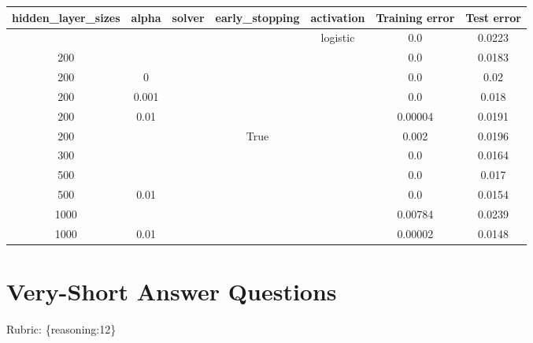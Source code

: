 \documentclass{article}
\def\rubric#1{\gre{Rubric: \{#1\}}}{}
\def\gre#1{{\color{gre}#1}}
\begin{document}
\begin{center}
\begin{tabular}{ |c|c|c|c|c||c|c| } 
 \hline
 hidden\_layer\_sizes & alpha & solver & early\_stopping & activation & Training error & Test error \\ 
 \hline \hline
  & & & & logistic & 0.0 & 0.0223\\ 
 200 & & & & & 0.0 & 0.0183\\ 
 200 & 0& & & & 0.0 & 0.02\\ 
 200 & 0.001 & & & & 0.0 & 0.018\\ 
 200 & 0.01 & & & & 0.00004 & 0.0191\\ 
 200 & & & True & & 0.002 & 0.0196\\ 
 300 & & & & & 0.0 & 0.0164\\ 
 500 & & & & & 0.0 & 0.017\\ 
 500 & 0.01 & & & & 0.0 & 0.0154\\ 
 1000 & & & & & 0.00784 & 0.0239\\ 
 1000 & 0.01 & & & & 0.00002 & 0.0148\\ 
 \hline
\end{tabular}
\end{center}




\section{Very-Short Answer Questions}
\rubric{reasoning:12}
\end{document}
